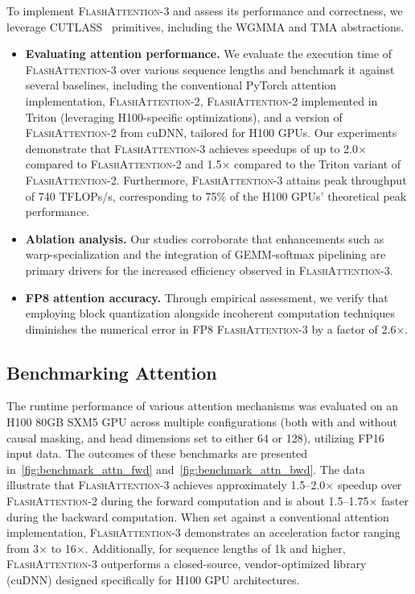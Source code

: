 To implement \textsc{FlashAttention-3} and assess its performance and correctness, we leverage CUTLASS~\citep{Thakkar_CUTLASS_2023} primitives, including the WGMMA and TMA abstractions.

\begin{itemize}

\item \textbf{Evaluating attention performance.} We evaluate the execution time of \textsc{FlashAttention-3} over various sequence lengths and benchmark it against several baselines, including the conventional PyTorch attention implementation, \textsc{FlashAttention-2}, \textsc{FlashAttention-2} implemented in Triton (leveraging H100-specific optimizations), and a version of \textsc{FlashAttention-2} from cuDNN, tailored for H100 GPUs. Our experiments demonstrate that \textsc{FlashAttention-3} achieves speedups of up to 2.0$\times$ compared to \textsc{FlashAttention-2} and 1.5$\times$ compared to the Triton variant of \textsc{FlashAttention-2}. Furthermore, \textsc{FlashAttention-3} attains peak throughput of 740 TFLOPs/s, corresponding to 75\% of the H100 GPUs' theoretical peak performance.
\item \textbf{Ablation analysis.} Our studies corroborate that enhancements such as warp-specialization and the integration of GEMM-softmax pipelining are primary drivers for the increased efficiency observed in \textsc{FlashAttention-3}.
\item \textbf{FP8 attention accuracy.} Through empirical assessment, we verify that employing block quantization alongside incoherent computation techniques diminishes the numerical error in FP8 \textsc{FlashAttention-3} by a factor of 2.6$\times$.
\end{itemize}

\subsection{Benchmarking Attention}
\label{subsec:benchmark_attn}

The runtime performance of various attention mechanisms was evaluated on an H100 80GB SXM5 GPU across multiple configurations (both with and without causal masking, and head dimensions set to either 64 or 128), utilizing FP16 input data. The outcomes of these benchmarks are presented in~\cref{fig:benchmark_attn_fwd} and~\cref{fig:benchmark_attn_bwd}. The data illustrate that \textsc{FlashAttention-3} achieves approximately 1.5–2.0$\times$ speedup over \textsc{FlashAttention-2} during the forward computation and is about 1.5–1.75$\times$ faster during the backward computation. When set against a conventional attention implementation, \textsc{FlashAttention-3} demonstrates an acceleration factor ranging from 3$\times$ to 16$\times$. Additionally, for sequence lengths of 1k and higher, \textsc{FlashAttention-3} outperforms a closed-source, vendor-optimized library (cuDNN) designed specifically for H100 GPU architectures.


